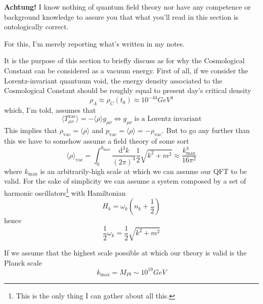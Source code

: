 \textbf{Achtung!} I know nothing of quantum field theory nor have any competence or background knowledge to assure you that what you'll read in this section is ontologically correct.
\par For this, I'm merely reporting what's written in my notes.
\vspace{0.3cm}
\par It is the purpose of this section to briefly discuss as for why the Cosmological Constant can be considered as a vacuum energy. First of all, if we consider the Lorentz-invariant quantuum void, the energy density associated to the Cosmological Constant should be roughly equal to present day's critical density 
\begin{equation}
    \rho_{\Lambda} \approx \rho_{C}(t_{0}) \approx 10^{-44}\unit{GeV}^{4}
\end{equation}
which, I'm told, assumes that $$\langle T_{\mu\nu}^{\text{vac}} \rangle = -\langle \rho \rangle g_{\mu\nu} \iff g_{\mu\nu}\;\text{is a Lorentz invariant}$$
This implies that $\rho_{\text{vac}} = \langle \rho \rangle$ and $p_{\text{vac}} = \langle \rho \rangle = -\rho_{\text{vac}}$. But to go any further than this we have to somehow assume a field theory of some sort 
\begin{equation}
    \langle \rho \rangle_{\text{vac}} = \int_{0}^{k_{\text{max}}} \frac{\text{d}^{3}k}{(2\pi)^{3}}\frac{1}{2}\sqrt{k^{2}+m^{2}} \approx \frac{k_{\text{max}}^{4}}{16\pi^{2}}
\end{equation}
where $k_{\text{max}}$ is an arbitrarily-high scale at which we can assume our QFT to be valid. For the sake of simplicity we can assume a system composed by a set of harmonic oscillators\footnote{This is the only thing I can gather about all this.} with Hamiltonian
\begin{equation}
    H_{k} = \omega_{k}\left(n_{k}+\frac{1}{2}\right)
\end{equation}
hence 
\begin{equation}
    \frac{1}{2}\omega_{k} = \frac{1}{2}\sqrt{k^{2}+m^{2}}
\end{equation}
\par If we assume that the highest scale possible at which our theory is valid is the Planck scale
\begin{equation}
    k_{\text{max}} = M_{Pl} \sim 10^{19}\unit{GeV}
\end{equation}
